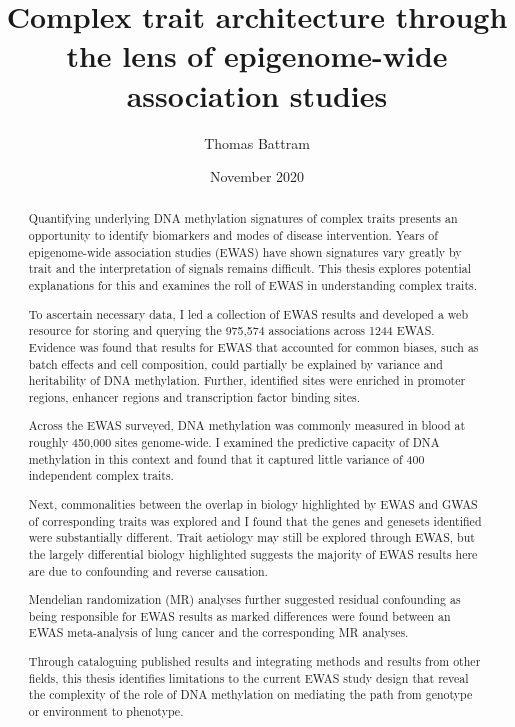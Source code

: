 \documentclass[11pt,oneside]{bristolthesis}
\title{Complex trait architecture through the lens of epigenome-wide association studies}
\author{Thomas Battram}
\date{November 2020}
\begin{document}
  \maketitle

\frontmatter %
\pagestyle{empty} %
  \begin{abstract}
    Quantifying underlying DNA methylation signatures of complex traits presents an opportunity to identify biomarkers and modes of disease intervention. Years of epigenome-wide association studies (EWAS) have shown signatures vary greatly by trait and the interpretation of signals remains difficult. This thesis explores potential explanations for this and examines the roll of EWAS in understanding complex traits.

    To ascertain necessary data, I led a collection of EWAS results and developed a web resource for storing and querying the 975,574 associations across 1244 EWAS. Evidence was found that results for EWAS that accounted for common biases, such as batch effects and cell composition, could partially be explained by variance and heritability of DNA methylation. Further, identified sites were enriched in promoter regions, enhancer regions and transcription factor binding sites.

    Across the EWAS surveyed, DNA methylation was commonly measured in blood at roughly 450,000 sites genome-wide. I examined the predictive capacity of DNA methylation in this context and found that it captured little variance of 400 independent complex traits.

    Next, commonalities between the overlap in biology highlighted by EWAS and GWAS of corresponding traits was explored and I found that the genes and genesets identified were substantially different. Trait aetiology may still be explored through EWAS, but the largely differential biology highlighted suggests the majority of EWAS results here are due to confounding and reverse causation.

    Mendelian randomization (MR) analyses further suggested residual confounding as being responsible for EWAS results as marked differences were found between an EWAS meta-analysis of lung cancer and the corresponding MR analyses.

    Through cataloguing published results and integrating methods and results from other fields, this thesis identifies limitations to the current EWAS study design that reveal the complexity of the role of DNA methylation on mediating the path from genotype or environment to phenotype.
  \end{abstract}
\end{document}
